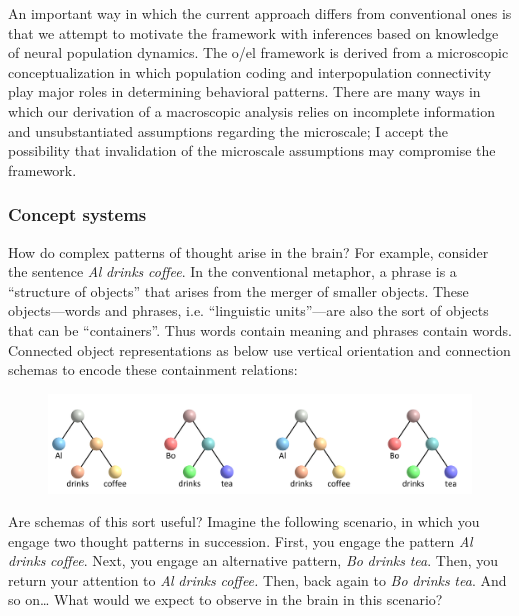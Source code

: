   An important way in which the current approach differs from conventional ones is that we attempt to motivate the framework with inferences based on knowledge of neural population dynamics. The o/el framework is derived from a microscopic conceptualization in which population coding and interpopulation connectivity play major roles in determining behavioral patterns. There are many ways in which our derivation of a macroscopic analysis relies on incomplete information and unsubstantiated assumptions regarding the microscale; I accept the possibility that invalidation of the microscale assumptions may compromise the framework.

\subsubsection{Concept systems}

How do complex patterns of thought arise in the brain? For example, consider the sentence \textit{Al} \textit{drinks} \textit{coffee}. In the conventional metaphor, a phrase is a “structure of objects” that arises from the merger of smaller objects. These objects—words and phrases, i.e. “linguistic units”—are also the sort of objects that can be “containers”. Thus words contain meaning and phrases contain words. Connected object representations as below use vertical orientation and connection schemas to encode these containment relations:

  
\begin{figure}
\includegraphics[width=\textwidth]{figures/Tilsen-img8.png}
\caption{\missingcaption}
\label{fig:}
\end{figure}
 

  Are schemas of this sort useful? Imagine the following scenario, in which you engage two thought patterns in succession. First, you engage the pattern \textit{Al} \textit{drinks} \textit{coffee}. Next, you engage an alternative pattern, \textit{Bo} \textit{drinks} \textit{tea}. Then, you return your attention to \textit{Al} \textit{drinks} \textit{coffee.} Then, back again to \textit{Bo} \textit{drinks} \textit{tea}. And so on… What would we expect to observe in the brain in this scenario? 


